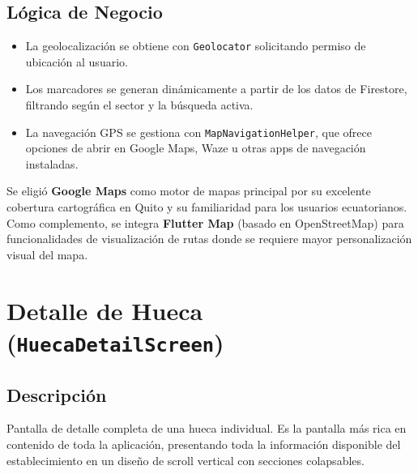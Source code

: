 \documentclass[11pt, a4paper, oneside]{report}
\begin{document}
\subsection{Lógica de Negocio}
\begin{itemize}
  \item La geolocalización se obtiene con \texttt{Geolocator} solicitando permiso de ubicación al usuario.
  \item Los marcadores se generan dinámicamente a partir de los datos de Firestore, filtrando según el sector y la búsqueda activa.
  \item La navegación GPS se gestiona con \texttt{MapNavigationHelper}, que ofrece opciones de abrir en Google Maps, Waze u otras apps de navegación instaladas.
\end{itemize}

\begin{decisionbox}
  Se eligió \textbf{Google Maps} como motor de mapas principal por su excelente cobertura cartográfica en Quito y su familiaridad para los usuarios ecuatorianos. Como complemento, se integra \textbf{Flutter Map} (basado en OpenStreetMap) para funcionalidades de visualización de rutas donde se requiere mayor personalización visual del mapa.
\end{decisionbox}

\section{Detalle de Hueca (\texttt{HuecaDetailScreen})}

\subsection{Descripción}
Pantalla de detalle completa de una hueca individual. Es la pantalla más rica en contenido de toda la aplicación, presentando toda la información disponible del establecimiento en un diseño de scroll vertical con secciones colapsables.
\end{document}
